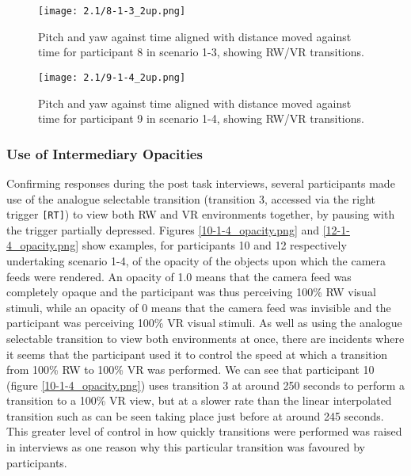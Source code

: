 \begin{figure}
	\begin{center}
	\texttt{[image: 2.1/8-1-3\_2up.png]}
	\caption{Pitch and yaw against time aligned with distance moved against time for participant 8 in scenario 1-3, showing RW/VR transitions.}
	\label{8-1-3_2up.png}
	\end{center}
\end{figure}

\begin{figure}
	\begin{center}
	\texttt{[image: 2.1/9-1-4\_2up.png]}
	\caption{Pitch and yaw against time aligned with distance moved against time for participant 9 in scenario 1-4, showing RW/VR transitions.}
	\label{9-1-4_2up.png}
	\end{center}
\end{figure}


\subsubsection{Use of Intermediary Opacities}

Confirming responses during the post task interviews, several participants made use of the analogue selectable transition (transition 3, accessed via the right trigger \texttt{[RT]}) to view both RW and VR environments together, by pausing with the trigger partially depressed. Figures \ref{10-1-4_opacity.png} and \ref{12-1-4_opacity.png} show examples, for participants 10 and 12 respectively undertaking scenario 1-4, of the opacity of the objects upon which the camera feeds were rendered. An opacity of 1.0 means that the camera feed was completely opaque and the participant was thus perceiving 100\% RW visual stimuli, while an opacity of 0 means that the camera feed was invisible and the participant was perceiving 100\% VR visual stimuli. As well as using the analogue selectable transition to view both environments at once, there are incidents where it seems that the participant used it to control the speed at which a transition from 100\% RW to 100\% VR was performed. We can see that participant 10 (figure \ref{10-1-4_opacity.png}) uses transition 3 at around 250 seconds to perform a transition to a 100\% VR view, but at a slower rate than the linear interpolated transition such as can be seen taking place just before at around 245 seconds. This greater level of control in how quickly transitions were performed was raised in interviews as one reason why this particular transition was favoured by participants.

